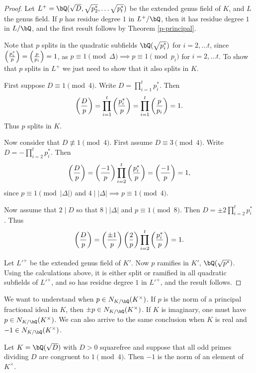 \begin{proof}
   Let $L^+ = \bQ(\sqrt{D}, \sqrt{p_2^*}, \ldots \sqrt{p_t^*})$ be the extended genus field of $K$, and $L$ the genus field. If $p$ has residue degree $1$ in $L^+ / \bQ$, then it has residue degree $1$ in $L / \bQ$, and the first result follows by Theorem \ref{p-principal}. 

   Note that $p$ splits in the quadratic subfields $\bQ(\sqrt{p_i^*})$ for $i = 2, \ldots t$, since $\left( \frac{p_i^*}{p} \right)  = \left( \frac{p}{p_i} \right)  = 1$, as $p \equiv 1 \pmod {\Delta} \implies p \equiv 1 \pmod {p_i}$ for $i = 2, \ldots t$. To show that $p$ splits in $L^+$ we just need to show that it also splits in $K$. 
   
   First suppose $D \equiv 1 \pmod 4$. Write $D = \prod_{i=1}^t p_i^*$. Then 
    \[ \left( \frac{D}{p} \right)  = \prod_{i = 1}^t \left( \frac{p_i^*}{p} \right)  = \prod_{i = 1}^t \left( \frac{p}{p_i} \right)  = 1. \]
    Thus $p$ splits in $K$.

    Now consider that $D \not\equiv 1 \pmod 4$. First assume $D \equiv 3 \pmod 4$. Write $D = -\prod_{i=2}^t p_i^*$. Then
    \[ \left( \frac{D}{p} \right)  = \left( \frac{-1}{p} \right)  \prod_{i = 2}^t \left( \frac{p_i^*}{p} \right)  = \left( \frac{-1}{p} \right)  = 1, \] 
    since $p \equiv 1 \pmod {|\Delta|}$ and $4 \mid |\Delta| \implies p \equiv 1 \pmod 4$. 

    Now assume that $2 \mid D$ so that $8 \mid |\Delta|$ and $p \equiv 1 \pmod 8$. Then $D = \pm 2 \prod_{i = 2}^t p_i^*$. Thus
    \[ \left( \frac{D}{p} \right)  = \left( \frac{\pm 1}{p} \right)  \left( \frac{2}{p} \right) \prod_{i = 2}^t \left( \frac{p_i^*}{p} \right)  = 1 .\] 

    Let $L'^{+}$ be the extended genus field of $K'$. Now $p$ ramifies in $K'$, $\bQ(\sqrt{p^*})$. Using the calculations above, it is either split or ramified in all quadratic subfields of $L'^{+}$, and so has residue degree $1$ in $L'^{+}$, and the result follows. 
\end{proof}

We want to understand when $p \in N_{K / \bQ}(K^{\times})$. If $p$ is the norm of a principal fractional ideal in $K$, then $\pm p \in N_{K / \bQ}(K^{\times})$. If $K$ is imaginary, one must have $p \in N_{K / \bQ}(K^{\times})$. We can also arrive to the same conclusion when $K$ is real and $-1 \in N_{K / \bQ}(K^{\times})$. 

\begin{thm}\label{minus-one-norm}
Let $K = \bQ(\sqrt{D})$ with $D >0$ squarefree and suppose that all odd primes dividing $D$ are congruent to $1 \pmod 4$. Then $-1$ is the norm of an element of $K^{\times}$. 
\end{thm}

